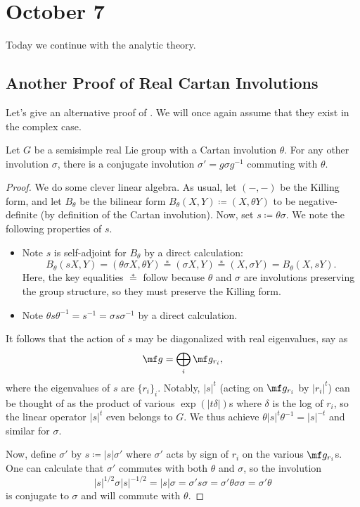 \documentclass[../notes.tex]{subfiles}
\begin{document}
\section{October 7}
Today we continue with the analytic theory.

\subsection{Another Proof of Real Cartan Involutions}
Let's give an alternative proof of . We will once again assume that they exist in the complex case.
\begin{lemma} \label{lem:make-involutions-commute}
	Let $G$ be a semisimple real Lie group with a Cartan involution $\theta$. For any other involution $\sigma$, there is a conjugate involution $\sigma'=g\sigma g^{-1}$ commuting with $\theta$.
\end{lemma}
\begin{proof}
	We do some clever linear algebra. As usual, let $(-,-)$ be the Killing form, and let $B_\theta$ be the bilinear form $B_\theta(X,Y)\coloneqq(X,\theta Y)$ to be negative-definite (by definition of the Cartan involution). Now, set $s\coloneqq\theta\sigma$. We note the following properties of $s$.
	\begin{itemize}
		\item Note $s$ is self-adjoint for $B_\theta$ by a direct calculation:
		\[B_\theta(sX,Y)=(\theta\sigma X,\theta Y)\stackrel*=(\sigma X,Y)\stackrel*=(X,\sigma Y)=B_\theta(X,sY).\]
		Here, the key equalities $\stackrel*=$ follow because $\theta$ and $\sigma$ are involutions preserving the group structure, so they must preserve the Killing form.
		\item Note $\theta s\theta^{-1}=s^{-1}=\sigma s\sigma^{-1}$ by a direct calculation.
	\end{itemize}
	It follows that the action of $s$ may be diagonalized with real eigenvalues, say as
	\[\mf g=\bigoplus_i\mf g_{r_i},\]
	where the eigenvalues of $s$ are $\{r_i\}_i$. Notably, $\left|s\right|^t$ (acting on $\mf g_{r_i}$ by $\left|r_i\right|^t$) can be thought of as the product of various $\exp(\left|t\delta\right|)$s where $\delta$ is the log of $r_i$, so the linear operator $\left|s\right|^t$ even belongs to $G$. We thus achieve $\theta\left|s\right|^t\theta^{-1}=\left|s\right|^{-t}$ and similar for $\sigma$.

	Now, define $\sigma'$ by $s\coloneqq\left|s\right|\sigma'$ where $\sigma'$ acts by sign of $r_i$ on the various $\mf g_{r_i}$s. One can calculate that $\sigma'$ commutes with both $\theta$ and $\sigma$, so the involution
	\[\left|s\right|^{1/2}\sigma\left|s\right|^{-1/2}=\left|s\right|\sigma=\sigma's\sigma=\sigma'\theta\sigma\sigma=\sigma'\theta\]
	is conjugate to $\sigma$ and will commute with $\theta$.
\end{proof}
\end{document}
